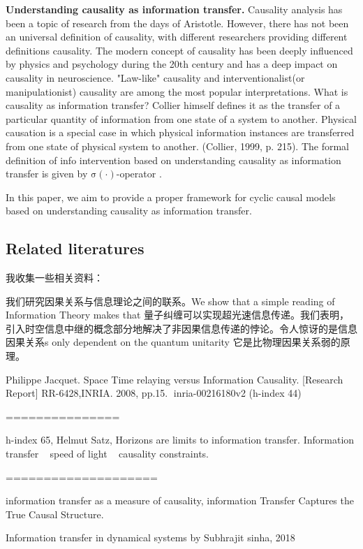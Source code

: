 \documentclass[letterpaper, onecolumn]{article}
\newcommand{\info}{\mathrm{\sigma}}
\begin{document}
\begin{CJK*}{UTF8}{gbsn}
    \textbf{Understanding causality as information transfer.} Causality analysis has been a topic of research from the days of Aristotle. However, there has not been an universal definition of causality, with different researchers providing different definitions causality. The modern concept of causality has been deeply influenced by physics and psychology during the 20th century and has a deep impact on causality in neuroscience. "Law-like" causality and interventionalist(or manipulationist) causality are among the most popular interpretations\cite{BernardFeltz2019}.  What is causality as information transfer? Collier himself defines it as the transfer of a particular quantity of information from one state of a system to another\cite{collier1999causation}. Physical causation is a special case in which physical information instances are transferred from one state of physical system to another. (Collier, 1999, p. 215). The formal definition of info intervention based on understanding causality as information transfer is given by $\info(\cdot)$-operator \cite{Heyang2019}.
    
    In this paper, we aim to provide a proper framework for cyclic causal models based on understanding causality as information transfer.
    
\subsection{Related literatures}

我收集一些相关资料：

我们研究因果关系与信息理论之间的联系。We show that a simple reading of Information Theory makes that 量子纠缠可以实现超光速信息传递。我们表明，引入时空信息中继的概念部分地解决了非因果信息传递的悖论。令人惊讶的是信息因果关系s only dependent on the quantum unitarity 它是比物理因果关系弱的原理。

Philippe Jacquet.  Space Time relaying versus Information Causality.  [Research Report] RR-6428,INRIA. 2008, pp.15. ￿inria-00216180v2 (h-index 44)

===============

h-index	65, Helmut Satz, Horizons are limits to information transfer.
Information transfer ~ speed of light ~ causality constraints.

====================

information transfer as a measure of causality, information Transfer Captures the True Causal Structure. 

Information transfer in dynamical systems by Subhrajit sinha, 2018


\end{CJK*}
\end{document}

